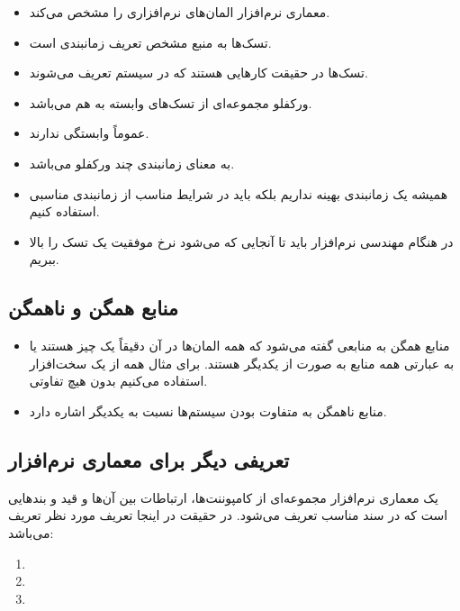 \begin{itemize}
    \item معماری نرم‌افزار المان‌های نرم‌افزاری را مشخص می‌کند.
    \item {} تسک‌ها به منبع مشخص تعریف زمانبندی است.
    \item تسک‌ها در حقیقت کار‌هایی هستند که در سیستم تعریف می‌شوند.
    \item ورکفلو مجموعه‌ای از تسک‌های وابسته به هم می‌باشد.
    \item {} عموماً وابستگی ندارند.
    \item {} به معنای زمانبندی چند ورکفلو
    می‌باشد.
    \item همیشه یک زمانبندی بهینه نداریم بلکه باید در شرایط مناسب از زمانبندی
    مناسبی استفاده کنیم.
    \item در هنگام مهندسی نرم‌افزار باید تا آنجایی که می‌شود نرخ موفقیت یک تسک
    را بالا ببریم.
\end{itemize}

\subsection{منابع همگن و ناهمگن}

\begin{itemize}
    \item منابع همگن به منابعی گفته می‌شود که همه المان‌ها در آن دقیقاً یک چیز
    هستند یا به عبارتی همه منابع به صورت  از یکدیگر هستند. برای مثال
    همه از یک سخت‌افزار استفاده می‌کنیم بدون هیچ تفاوتی.
    \item منابع ناهمگن به متفاوت بودن سیستم‌ها نسبت به یکدیگر اشاره دارد.
\end{itemize}

\subsection{تعریفی دیگر برای معماری نرم‌افزار}

یک معماری نرم‌افزار مجموعه‌ای از کامپوننت‌ها، ارتباطات بین آن‌ها و قید و
بند‌هایی است که در سند مناسب تعریف می‌شود. در حقیقت در اینجا تعریف مورد نظر
تعریف  می‌باشد:

\begin{enumerate}
    \item {}
    \item {}
    \item {}
\end{enumerate}

